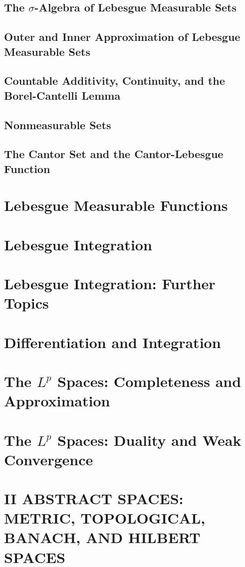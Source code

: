 \documentclass[a4paper,10pt]{book}
\theoremstyle{plain} %
\begin{document}
\section{The $\sigma$-Algebra of Lebesgue Measurable Sets}
\section{Outer and Inner Approximation of Lebesgue Measurable Sets}
\section{Countable Additivity, Continuity, and the Borel-Cantelli Lemma}
\section{Nonmeasurable Sets}
\section{The Cantor Set and the Cantor-Lebesgue Function}

\chapter{Lebesgue Measurable Functions}
\chapter{Lebesgue Integration}
\chapter{Lebesgue Integration: Further Topics}
\chapter{Differentiation and Integration}
\chapter{The $L^p$ Spaces: Completeness and Approximation}
\chapter{The $L^p$ Spaces: Duality and Weak Convergence}

\setcounter{chapter}{0}
\chapter*{II ABSTRACT SPACES: METRIC, TOPOLOGICAL, BANACH, AND HILBERT SPACES}
\setcounter{chapter}{8}
\end{document}
